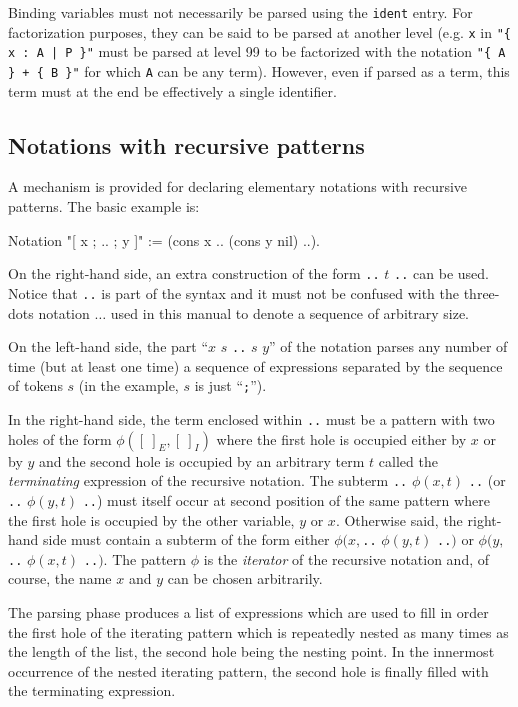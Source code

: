 \Rem Binding variables must not necessarily be parsed using the
{\tt ident} entry. For factorization purposes, they can be said to be
parsed at another level (e.g. {\tt x} in \verb="{ x : A | P }"= must be
parsed at level 99 to be factorized with the notation
\verb="{ A } + { B }"= for which {\tt A} can be any term).  
However, even if parsed as a term, this term must at the end be effectively 
a single identifier.

\subsection{Notations with recursive patterns}
\label{RecursiveNotations}

A mechanism is provided for declaring elementary notations with
recursive patterns. The basic example is:

\begin{coq_example*}
Notation "[ x ; .. ; y ]" := (cons x .. (cons y nil) ..).
\end{coq_example*}

On the right-hand side, an extra construction of the form {\tt ..} $t$
{\tt ..} can be used. Notice that {\tt ..} is part of the {\Coq}
syntax and it must not be confused with the three-dots notation
$\ldots$ used in this manual to denote a sequence of arbitrary size.

On the left-hand side, the part ``$x$ $s$ {\tt ..} $s$ $y$'' of the
notation parses any number of time (but at least one time) a sequence
of expressions separated by the sequence of tokens $s$ (in the
example, $s$ is just ``{\tt ;}'').

In the right-hand side, the term enclosed within {\tt ..} must be a
pattern with two holes of the form $\phi([~]_E,[~]_I)$ where the first
hole is occupied either by $x$ or by $y$ and the second hole is
occupied by an arbitrary term $t$ called the {\it terminating}
expression of the recursive notation. The subterm {\tt ..} $\phi(x,t)$
{\tt ..} (or {\tt ..} $\phi(y,t)$ {\tt ..})  must itself occur at
second position of the same pattern where the first hole is occupied
by the other variable, $y$ or $x$. Otherwise said, the right-hand side
must contain a subterm of the form either $\phi(x,${\tt ..}
$\phi(y,t)$ {\tt ..}$)$ or $\phi(y,${\tt ..}  $\phi(x,t)$ {\tt ..}$)$.
The pattern $\phi$ is the {\em iterator} of the recursive notation
and, of course, the name $x$ and $y$ can be chosen arbitrarily.

The parsing phase produces a list of expressions which are used to
fill in order the first hole of the iterating pattern which is
repeatedly nested as many times as the length of the list, the second
hole being the nesting point. In the innermost occurrence of the
nested iterating pattern, the second hole is finally filled with the
terminating expression.

